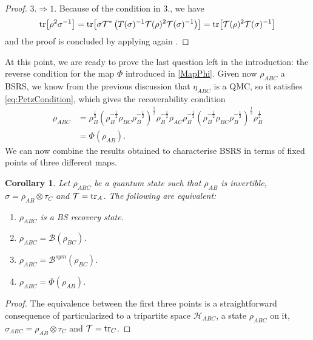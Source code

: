 \documentclass[11pt]{article}
\theoremstyle{newdefinition}
\theoremstyle{newplain}
\newtheorem{corollary}[definition]{Corollary}
\theoremstyle{myplain}
\DeclareMathOperator{\1}{\mathds{1}}
\begin{document}
{\begin{proof}
 \noindent  \underline{$3. \Rightarrow 1. $}  Because of the condition in 3., we have 
    \begin{equation}
        \tr[\rho^2 \sigma^{-1}] = \tr[\sigma \mathcal{T}^\ast\left(T(\sigma)^{-1} \mathcal{T}(\rho)^2 \mathcal{T}(\sigma)^{-1}\right)] = \tr[\mathcal{T}(\rho)^2 \mathcal{T}(\sigma)^{-1}]
    \end{equation}
    and the proof is concluded by applying again \cite[Theorem 3.34]{HiaiMosonyi-f-divergences-2017}.
     
\end{proof}


At this point, we are ready to prove the last question left in the introduction: the reverse condition for the map $\Phi$ introduced in \eqref{MapPhi}. Given now $\rho_{ABC}$ a BSRS, we know from the previous discussion that $\eta_{ABC}$ is a QMC, so it satisfies \eqref{eq:PetzCondition}, which  gives the recoverability condition 
\begin{subequations}
\begin{align}
    \rho_{ABC}&=\rho_B^{\frac{1}{2}}\left( \rho_B^{-\frac{1}{2}}\rho_{BC}\rho_B^{-\frac{1}{2}}   \right)^{\frac{1}{2}}\rho_B^{-\frac{1}{2}}\rho_{AC}\rho_B^{-\frac{1}{2}}\left( \rho_B^{-\frac{1}{2}}\rho_{BC}\rho_B^{-\frac{1}{2}}   \right)^{\frac{1}{2}}\rho_B^{\frac{1}{2}}\\
    &=\Phi(\rho_{AB}).
\end{align}
\end{subequations}
We can now combine the results obtained to characterise BSRS in terms of fixed points of three different maps.

\begin{corollary}\label{cor:equiv_conditions_BSRS}
    Let $\rho_{ABC}$ be a quantum state such that $\rho_{AB}$ is invertible, $\sigma=\rho_{AB}\otimes \tau_C$ and $\mathcal{T}=\tr_A$. The following are equivalent:
    \begin{enumerate}
        \item $\rho_{ABC}$ is a BS recovery state.
        \item $\rho_{ABC}=\mathcal{B}(\rho_{BC})$.
        \item $\rho_{ABC}=\mathcal{B}^{sym}(\rho_{BC})$.
        \item $\rho_{ABC}=\Phi(\rho_{AB})$.
    \end{enumerate}
\end{corollary}

\begin{proof}
    The equivalence between the first three points is a straightforward consequence of  particularized to a tripartite space $\mathcal{H}_{ABC}$, a state $\rho_{ABC}$ on it, $\sigma_{ABC}=\rho_{AB} \otimes \tau_C$ and $\mathcal{T}=\tr_C$.


\end{proof}}
\end{document}
